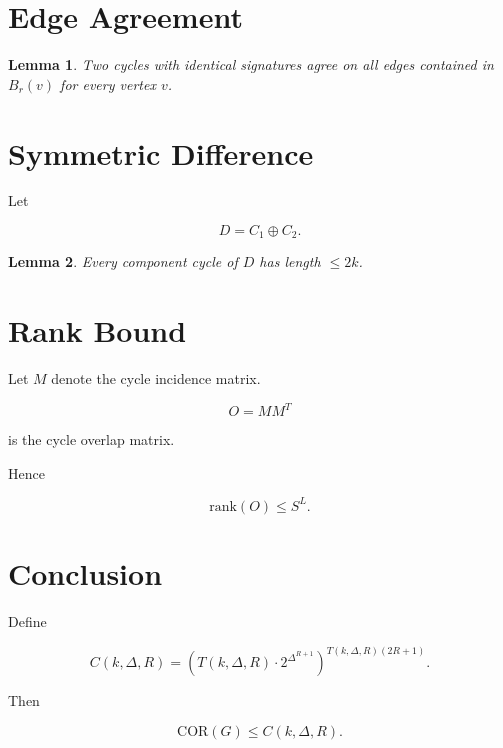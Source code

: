 \documentclass[11pt]{article}
\newtheorem{lemma}{Lemma}
\begin{document}
\section{Edge Agreement}

\begin{lemma}

Two cycles with identical signatures agree on all edges
contained in $B_r(v)$ for every vertex $v$.

\end{lemma}

\section{Symmetric Difference}

Let

\[
D=C_1\oplus C_2.
\]

\begin{lemma}

Every component cycle of $D$ has length $\le 2k$.

\end{lemma}

\section{Rank Bound}

Let $M$ denote the cycle incidence matrix.

\[
O=MM^T
\]

is the cycle overlap matrix.

Hence

\[
\mathrm{rank}(O)\le S^L.
\]

\section{Conclusion}

Define

\[
C(k,\Delta,R)
=
\left(
T(k,\Delta,R)\cdot
2^{\Delta^{R+1}}
\right)^{T(k,\Delta,R)(2R+1)}.
\]

Then

\[
\mathrm{COR}(G)\le C(k,\Delta,R).
\]
\end{document}
